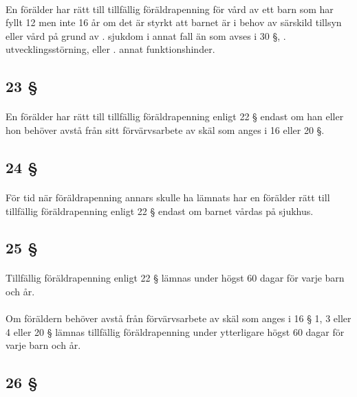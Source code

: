 \documentclass[a4paper,notitlepage,openany,10pt]{book}
\begin{document}
\paragraph*{}
En förälder har rätt till tillfällig föräldrapenning för vård av ett barn som har fyllt 12 men inte 16 år om det är styrkt att barnet är i behov av särskild tillsyn eller vård på grund av
. sjukdom i annat fall än som avses i 30 §,
. utvecklingsstörning, eller
. annat funktionshinder.
\subsection*{23 §}
\paragraph*{}
En förälder har rätt till tillfällig föräldrapenning enligt 22 § endast om han eller hon behöver avstå från sitt förvärvsarbete av skäl som anges i 16 eller 20 §.
\subsection*{24 §}
\paragraph*{}
För tid när föräldrapenning annars skulle ha lämnats har en förälder rätt till tillfällig föräldrapenning enligt 22 § endast om barnet vårdas på sjukhus.
\subsection*{25 §}
\paragraph*{}
Tillfällig föräldrapenning enligt 22 § lämnas under högst 60 dagar för varje barn och år.
\paragraph*{}
Om föräldern behöver avstå från förvärvsarbete av skäl som anges i 16 § 1, 3 eller 4 eller 20 § lämnas tillfällig föräldrapenning under ytterligare högst 60 dagar för varje barn och år.
\subsection*{26 §}
\end{document}
